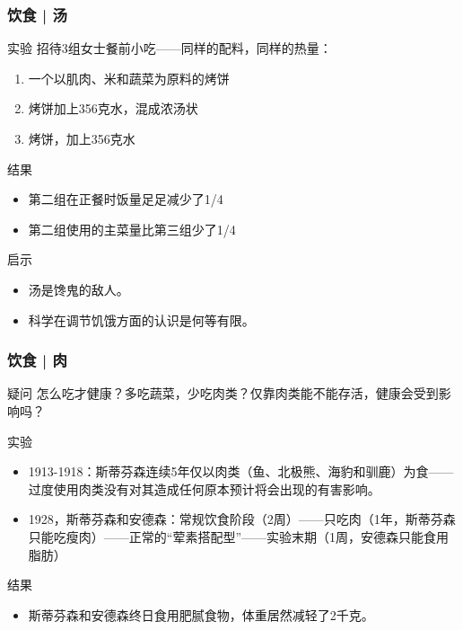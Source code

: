 \begin{frame}
  \frametitle{饮食 | 汤}
  \begin{block}{实验}
    招待3组女士餐前小吃——同样的配料，同样的热量：
    \begin{enumerate}
      \item 一个以肌肉、米和蔬菜为原料的烤饼
      \item 烤饼加上356克水，混成浓汤状
      \item 烤饼，加上356克水
    \end{enumerate}
  \end{block}
  \pause
  \begin{block}{结果}
    \begin{itemize}
      \item 第二组在正餐时饭量足足减少了1/4
      \item 第二组使用的主菜量比第三组少了1/4
    \end{itemize}
  \end{block}
  \pause
  \begin{block}{启示}
    \begin{itemize}
      \item 汤是馋鬼的敌人。
      \item 科学在调节饥饿方面的认识是何等有限。
    \end{itemize}
  \end{block}
\end{frame}

\begin{frame}
  \frametitle{饮食 | 肉}
  \begin{block}{疑问}
    怎么吃才健康？多吃蔬菜，少吃肉类？仅靠肉类能不能存活，健康会受到影响吗？
  \end{block}
  \pause
  \begin{block}{实验}
    \begin{itemize}
      \item 1913-1918：斯蒂芬森连续5年仅以肉类（鱼、北极熊、海豹和驯鹿）为食——过度使用肉类没有对其造成任何原本预计将会出现的有害影响。
      \item 1928，斯蒂芬森和安德森：常规饮食阶段（2周）——只吃肉（1年，斯蒂芬森只能吃瘦肉）——正常的“荤素搭配型”——实验末期（1周，安德森只能食用脂肪）
    \end{itemize}
  \end{block}
  \pause
  \begin{block}{结果}
    \begin{itemize}
      \item 斯蒂芬森和安德森终日食用肥腻食物，体重居然减轻了2千克。
    \end{itemize}
  \end{block}
\end{frame}

